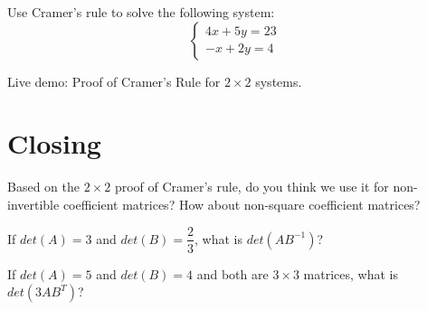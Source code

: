 \documentclass[11pt]{exam}
\begin{document}
    \vspace{20px}
    \begin{questions}
        \item Use Cramer's rule to solve the following system:
        $$\begin{cases}
            4x + 5y = 23 \\
            -x + 2y = 4
        \end{cases}$$
    \end{questions}

    Live demo: Proof of Cramer's Rule for $2 \times 2$ systems.

\pagebreak
\section{Closing}
\begin{questions}
    \item Based on the $2 \times 2$ proof of Cramer's rule, do you think we use it for non-invertible coefficient matrices?
    How about non-square coefficient matrices?
    \item If $det(A) = 3$ and $det(B) = \dfrac{2}{3}$, what is $det(AB^{-1})$?
    \item If $det(A) = 5$ and $det(B) = 4$ and both are $3 \times 3$ matrices, what is $det(3AB^T)$?
\end{questions}
\end{document}
